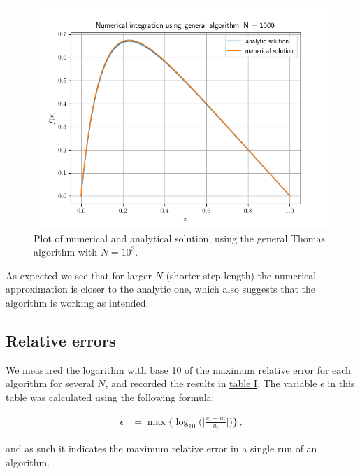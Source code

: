 \documentclass[english,notitlepage,reprint,nofootinbib]{revtex4-1}  %
\begin{document}
\begin{figure}[H]
	\centering
	\label{fig:iv:a:3}
	\includegraphics[width=\columnwidth]{plots/Figure_3.png}
	\caption{Plot of numerical and analytical solution, using the general Thomas algorithm with
	\(N=10^{3}\).}
\end{figure}


As expected we see that for larger $N$ (shorter step length) the numerical approximation is closer to the analytic one, which also suggests that the algorithm is working as intended.


\subsection{Relative errors} \label{subsec:IV:B}

We measured the logarithm with base 10 of the maximum relative error for each algorithm for several $N$, and recorded the results in \hyperref[table:iv:b:1]{table I}. The variable $\epsilon$ in this table was calculated using the following formula:

\begin{align*}
\epsilon &= \max\bigg\{\log_{10} \bigg( \bigg| \frac{v_i-u_i}{u_i} \bigg| \bigg)\bigg\} \, ,
\end{align*} 

and as such it indicates the maximum relative error in a single run of an algorithm.
\end{document}
